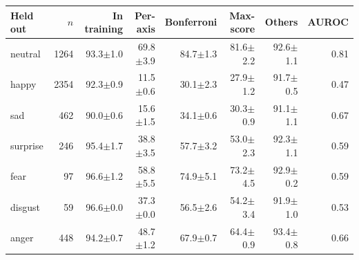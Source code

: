 \begin{tabular}{lrrrrrrr}
\toprule
Held out & $n$ & In training & Per-axis & Bonferroni & Max-score & Others & AUROC \\
\midrule
neutral & 1264 & 93.3$\pm$1.0 & 69.8$\pm$3.9 & 84.7$\pm$1.3 & 81.6$\pm$2.2 & 92.6$\pm$1.1 & 0.81 \\
happy & 2354 & 92.3$\pm$0.9 & 11.5$\pm$0.6 & 30.1$\pm$2.3 & 27.9$\pm$1.2 & 91.7$\pm$0.5 & 0.47 \\
sad & 462 & 90.0$\pm$0.6 & 15.6$\pm$1.5 & 34.1$\pm$0.6 & 30.3$\pm$0.9 & 91.1$\pm$1.1 & 0.67 \\
surprise & 246 & 95.4$\pm$1.7 & 38.8$\pm$3.5 & 57.7$\pm$3.2 & 53.0$\pm$2.3 & 92.3$\pm$1.1 & 0.59 \\
fear & 97 & 96.6$\pm$1.2 & 58.8$\pm$5.5 & 74.9$\pm$5.1 & 73.2$\pm$4.5 & 92.9$\pm$0.2 & 0.59 \\
disgust & 59 & 96.6$\pm$0.0 & 37.3$\pm$0.0 & 56.5$\pm$2.6 & 54.2$\pm$3.4 & 91.9$\pm$1.0 & 0.53 \\
anger & 448 & 94.2$\pm$0.7 & 48.7$\pm$1.2 & 67.9$\pm$0.7 & 64.4$\pm$0.9 & 93.4$\pm$0.8 & 0.66 \\
\bottomrule
\end{tabular}
